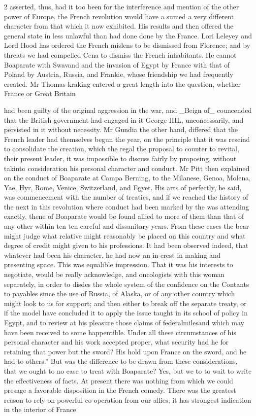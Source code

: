 \documentclass[10pt]{article}
\begin{document}
\begin{multicols}{2}
asserted, thus, had it too been for the interference and mention of the other power of Europe, the French revolution would have a sumed a very different character from that which it now exhibited. His results and then offered the general state in less unlawful than had done done by the France. Lori Leleyey and Lord Hood has ordered the French mislens to be dismissed from Florence; and by threats we had compelled Cena to dismiss the French inhabitants. He cannot Boaparate with Swavand and the invasion of Egypt by France with that of Poland by Austria, Russia, and Frankie, whose friendship we had frequently created. Mr Thomas kraking entered a great length into the question, whether France or Great Britain

had been guilty of the original aggression in the war, and \_Beign of\_ councended that the British government had engaged in it George IIIL, unconcessarily, and persisted in it without necessity. Mr Gundia the other hand, differed that the French leader had themselves begun the year, on the principle that it was rescind to consolidate the creation, which the regal the proposal to counter to revital, their present leader, it was impossible to discuss fairly by proposing, without takinto consideration his personal character and conduct. Mr Pitt then explained on the conduct of Boaparate at Campa Berning, to the Milanese, Genoa, Molena, Yae, Hyr, Rome, Venice, Switzerland, and Egyet. His arts of perfectly, he said, was commencement with the number of treatics, and if we reached the history of the next in this revolution where conduct had been marked by the was attending exactly, thene of Boaparate would be found allied to more of them than that of any other within ten ten careful and dissanitary years. From these cases the bear might judge what relative might reasonably be placed on this country and what degree of credit might given to his professions. It had been observed indeed, that whatever had been his character, he had now an in-crest in making and presenting space. This was equalible impression. That it was his interests to negotiate, would be really acknowledge, and oncologists with this woman separately, in order to disdes the whole system of the confidence on the Contants to payables since the use of Russia, of Alaska, or of any other country which might look to us for support; and then either to break off the separate treaty, or if the model have concluded it to apply the issue taught in its school of policy in Egypt, and to review at his pleasure those claims of federalmilesand which may have been received to some happentible. Under all these circumstances of his personal character and his work accepted proper, what security had he for retaining that power but the sword? His hold upon France on the sword, and he had to others.” But was the difference to be drawn from these considerations, that we ought to no case to treat with Boaparate? Yes, but we to to wait to write the effectiveness of facts. At present there was nothing from which we could presage a favorable disposition in the French comedy. There was the greatest reason to rely on powerful co-operation from our allies; it has strongest indication in the interior of France 
\end{multicols}
\end{document}

